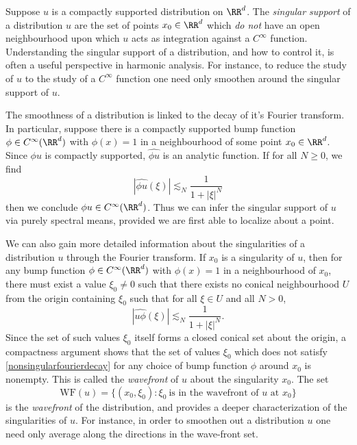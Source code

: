 Suppose $u$ is a compactly supported distribution on $\RR^d$. The \emph{singular support} of a distribution $u$ are the set of points $x_0 \in \RR^d$ which \emph{do not} have an open neighbourhood upon which $u$ acts as integration against a $C^\infty$ function. Understanding the singular support of a distribution, and how to control it, is often a useful perspective in harmonic analysis. For instance, to reduce the study of $u$ to the study of a $C^\infty$ function one need only smoothen around the singular support of $u$.

The smoothness of a distribution is linked to the decay of it's Fourier transform. In particular, suppose there is a compactly supported bump function $\phi \in C^\infty(\RR^d)$ with $\phi(x) = 1$ in a neighbourhood of some point $x_0 \in \RR^d$. Since $\phi u$ is compactly supported, $\widehat{\phi u}$ is an analytic function. If for all $N \geq 0$, we find
%
\begin{equation}
  |\widehat{\phi u}(\xi)| \lesssim_N \frac{1}{1 + |\xi|^N}
\end{equation}
%
then we conclude $\phi u \in C^\infty(\RR^d)$. Thus we can infer the singular support of $u$ via purely spectral means, provided we are first able to localize about a point.

We can also gain more detailed information about the singularities of a distribution $u$ through the Fourier transform. If $x_0$ is a singularity of $u$, then for any bump function $\phi \in C^\infty(\RR^d)$ with $\phi(x) = 1$ in a neighbourhood of $x_0$, there must exist a value $\xi_0 \neq 0$ such that there exists no conical neighbourhood $U$ from the origin containing $\xi_0$ such that for all $\xi \in U$ and all $N > 0$,
%
\begin{equation} \label{nonsingularfourierdecay}
  |\widehat{u \phi}(\xi)| \lesssim_N \frac{1}{1 + |\xi|^N}.
\end{equation}
%
Since the set of such values $\xi_0$ itself forms a closed conical set about the origin, a compactness argument shows that the set of values $\xi_0$ which does not satisfy \eqref{nonsingularfourierdecay} for any choice of bump function $\phi$ around $x_0$ is nonempty. This is called the \emph{wavefront} of $u$ about the singularity $x_0$. The set
%
\[ \text{WF}(u) = \{ (x_0,\xi_0) : \xi_0\ \text{is in the wavefront of $u$ at $x_0$} \} \]
%
is the \emph{wavefront} of the distribution, and provides a deeper characterization of the singularities of $u$. For instance, in order to smoothen out a distribution $u$ one need only average along the directions in the wave-front set.

